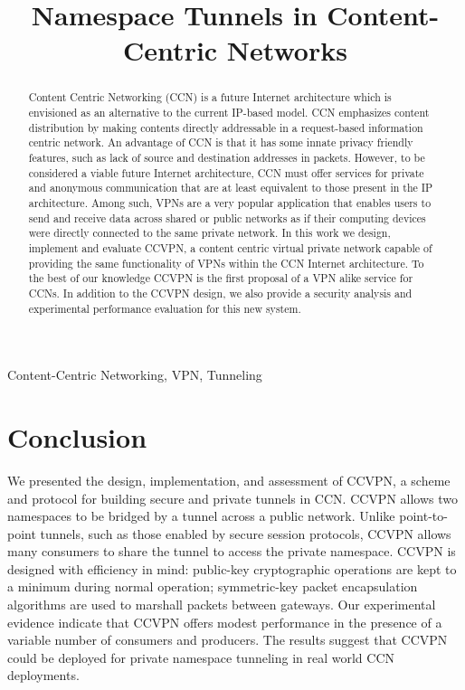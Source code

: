 \documentclass[conference,letterpaper,10pt]{IEEEtran}
\begin{document}
\title{Namespace Tunnels in Content-Centric Networks}

\maketitle


\begin{abstract}
Content Centric Networking (CCN) is a future Internet architecture which is envisioned as an alternative to the current IP-based model. CCN emphasizes content distribution by making contents directly addressable in a request-based information centric network. An advantage of CCN is that it has some innate privacy friendly features, such as lack of source and destination addresses in packets. However, to be considered a viable future Internet architecture, CCN must offer services for private and anonymous communication that are at least equivalent to those present in the IP architecture. Among such, VPNs are a very popular application that enables users to send and receive data across shared or public networks as if their computing devices were directly connected to the same private network. In this work we design, implement and evaluate CCVPN, a content centric virtual private network capable of providing the same functionality of VPNs within the CCN Internet architecture. To the best of our knowledge CCVPN is the first proposal of a VPN alike service for CCNs. In addition to the CCVPN design, we also provide a security analysis and experimental performance evaluation for this new system.
\end{abstract}

\begin{IEEEkeywords}
Content-Centric Networking, VPN, Tunneling
\end{IEEEkeywords}

\IEEEpeerreviewmaketitle









\section{Conclusion}\label{sec:conclusion}
We presented the design, implementation, and assessment of CCVPN, a scheme and
protocol for building secure and private tunnels in CCN. CCVPN allows two namespaces
to be bridged by a tunnel across a public network. Unlike point-to-point tunnels,
such as those enabled by secure session protocols, CCVPN allows many consumers
to share the tunnel to access the private namespace. CCVPN is designed with efficiency
in mind: public-key cryptographic operations are kept to a minimum during normal
operation; symmetric-key packet encapsulation algorithms are used to marshall
packets between gateways. Our experimental evidence indicate that CCVPN offers
modest performance in the presence of a variable number of consumers and producers.
The results suggest that CCVPN could be deployed for private namespace tunneling
in real world CCN deployments.
\end{document}
